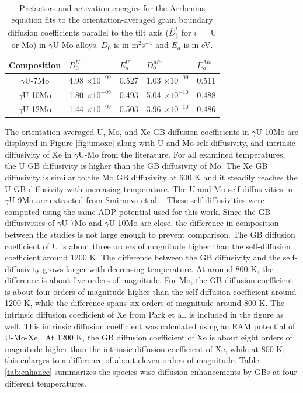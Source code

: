 \documentclass{elsarticle}
\begin{document}
\begin{table}[!ht]
\centering
\caption{Prefactors and activation energies for the Arrhenius equation fits to the orientation-averaged grain boundary diffusion coefficients parallel to the tilt axis ($\overline{D}^{i}_{\parallel}$ for $i=$ U or Mo) in $\gamma$U-Mo alloys. $D_0$ is in m$^2$s$^{-1}$ and $E_a$ is in eV.}
\label{tab:compArr}
\begin{tabular}{cllll}
\toprule
Composition
	& $D_{0}^U$      & $E_{a}^U$
	& $D_{0}^{Mo}$   & $E_{a}^{Mo}$ \\
\midrule
$\gamma$U-7Mo
	& 4.98 $\times 10^{-09}$ & 0.527
	& 1.03 $\times 10^{-09}$ & 0.511 \\
$\gamma$U-10Mo
	& 1.80 $\times 10^{-09}$ & 0.493
	& 5.04 $\times 10^{-10}$ & 0.488 \\
$\gamma$U-12Mo
	& 1.44 $\times 10^{-09}$ & 0.503
	& 3.96 $\times 10^{-10}$ & 0.486 \\
\bottomrule
\end{tabular}
\end{table}

The orientation-averaged U, Mo, and Xe GB diffusion coefficients in $\gamma$U-10Mo are displayed in Figure \ref{fig:umoxe} along with U and Mo self-diffusivity, and intrinsic diffusivity of Xe in $\gamma$U-Mo from the literature. For all examined temperatures, the U GB diffusivity is higher than the GB diffusivity of Mo. The Xe GB diffusivity is similar to the Mo GB diffusivity at 600 K and it steadily reaches the U GB diffusivity with increasing temperature. The U and Mo self-diffusivities in $\gamma$U-9Mo are extracted from Smirnova et al. \cite{smirnova2015}. These self-diffusivities were computed using the same ADP potential used for this work. Since the GB diffusivities of $\gamma$U-7Mo and $\gamma$U-10Mo are close, the difference in composition between the studies is not large enough to prevent comparison. The GB diffusion coefficient of U is about three orders of magnitude higher than the self-diffusion coefficient around 1200 K. The difference between the GB diffusivity and the self-diffusivity grows larger with decreasing temperature. At around 800 K, the difference is about five orders of magnitude. For Mo, the GB diffusion coefficient is about four orders of magnitude higher than the self-diffusion coefficient around 1200 K, while the difference spans six orders of magnitude around 800 K. The intrinsic diffusion coefficient of Xe from Park et al. \cite{park2023} is included in the figure as well. This intrinsic diffusion coefficient was calculated using an EAM potential of U-Mo-Xe \cite{smirnova2013}. At 1200 K, the GB diffusion coefficient of Xe is about eight orders of magnitude higher than the intrinsic diffusion coefficient of Xe, while at 800 K, this enlarges to a difference of about eleven orders of magnitude. Table \ref{tab:enhance} summarizes the species-wise diffusion enhancements by GBs at four different temperatures.
\end{document}
